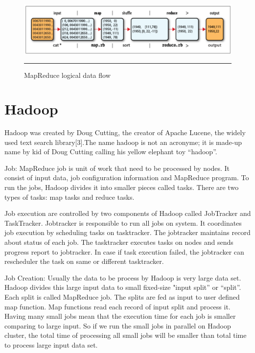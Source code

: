 \begin{figure}[htbp]
  \centering
    \includegraphics[width=\textwidth,height=\textheight,keepaspectratio]{./Figures/map-reduce.pdf}
    \rule{35em}{0.5pt}
  \caption{MapReduce logical data flow \cite{tom3}}
  \label{fig:map-reduce}
\end{figure}


\section{ Hadoop}

Hadoop was created by Doug Cutting, the creator of Apache Lucene, the widely used text search library[3].The name hadoop is not an acronyme; it is made-up name by kid of Doug Cutting calling his yellow elephant toy “hadoop”.


Job: MapReduce job is unit of work that need to be processed by nodes. It consist of input data, job configuration information and MapReduce program. To run the jobs, Hadoop divides it into smaller pieces called tasks. There are two types of tasks: map tasks and reduce tasks.

Job execution are controlled by two components of Hadoop called JobTracker and TaskTracker. Jobtracker is responsible to run all jobs on system. It coordinates job execution by scheduling tasks on tasktracker. The jobtracker maintains record about status of each job. The tasktracker executes tasks on nodes and sends progress report to jobtracker. In case if task execution failed, the jobtracker can rescheduler the task on same or different tasktracker.  

Job Creation: Usually the data to be process by Hadoop is very large data set. Hadoop divides this large input data to small fixed-size "input split” or “split”. Each split is called MapReduce job. The splits are fed as input to user defined map function. Map functions read each record of input split and process it. Having many small jobs mean that the execution time for each job is smaller comparing to large input. So if we run the small jobs in parallel on Hadoop cluster, the total time of processing all small jobs will be smaller than total time to process large input data set. 

